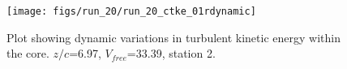 \begin{figure}[H]
\centering
\texttt{[image: figs/run\_20/run\_20\_ctke\_01rdynamic]}
\caption{Plot showing dynamic variations in turbulent kinetic energy within the core. $z/c$=6.97, $V_{free}$=33.39, station 2.}
\label{fig:run_20_ctke_01rdynamic}
\end{figure}



